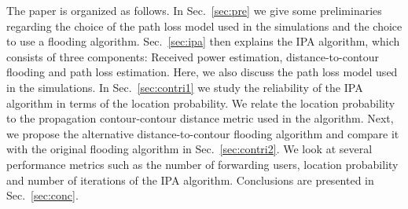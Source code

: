 The paper is organized as follows. In Sec.~\ref{sec:pre} we give some preliminaries regarding the choice of the path loss model used in the simulations and the choice to use a flooding algorithm. Sec.~\ref{sec:ipa} then explains the IPA algorithm, which consists of three components: Received power estimation, distance-to-contour flooding and path loss estimation. Here, we also discuss the path loss model used in the simulations. In Sec.~\ref{sec:contri1} we study the reliability of the IPA algorithm in terms of the location probability. We relate the location probability to the propagation contour-contour distance metric used in the algorithm. Next, we propose the alternative distance-to-contour flooding algorithm and compare it with the original flooding algorithm in Sec.~\ref{sec:contri2}. We look at several performance metrics such as the number of forwarding users, location probability and number of iterations of the IPA algorithm. Conclusions are presented in Sec.~\ref{sec:conc}. 

%